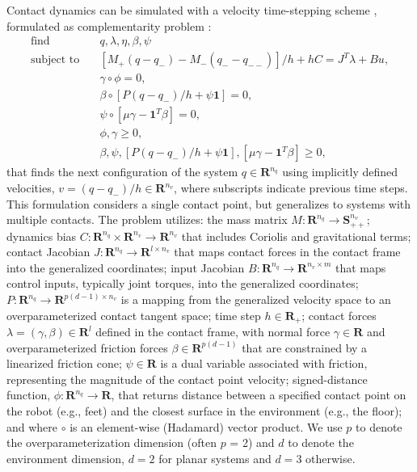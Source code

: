 Contact dynamics can be simulated with a velocity time-stepping scheme \cite{stewart1996implicit}, formulated as complementarity problem \cite{cottle2009linear}: 
\begin{align}
	\label{cipc_feas_prob}
	{\mbox{find}} \quad & q, \lambda,\eta, \beta, \psi \\
	\mbox{subject to} \quad & \left[M_{+}(q - q_{-}) - M_{-}(q_{-} - q_{--})\right] / h + h C = J^T \lambda + B u, \label{cipc_smooth_dynamics}\\
	& \gamma \circ \phi = 0, \label{cipc_impact_complementarity}\\
	& \beta \circ \left[ P (q - q_{-})/h + \psi \textbf{1} \right] = 0, \label{cipc_friction_complementarity} \\
	& \psi \circ \left[\mu \gamma - \textbf{1}^T \beta \right] = 0, \label{cipc_friction_velocity_complementarity}\\
	& \phi, \gamma \geq 0, \label{cipc_impact_inequalities} \\
	& \beta, \psi, [P (q - q_{-})/h + \psi \textbf{1}], [\mu \gamma - \textbf{1}^T \beta] \geq 0, \label{cipc_friction_inequalities}
\end{align}
that finds the next configuration of the system $q \in \mathbf{R}^{n_q}$ using implicitly defined velocities, $v = (q - q_{-}) / h \in \mathbf{R}^{n_v}$, where subscripts indicate previous time steps. This formulation considers a single contact point, but generalizes to systems with multiple contacts.
The problem utilizes: the mass matrix $M: \mathbf{R}^{n_q} \rightarrow \mathbf{S}_{++}^{n_v}$; dynamics bias $C: \mathbf{R}^{n_q} \times \mathbf{R}^{n_v} \rightarrow \mathbf{R}^{n_v}$ that includes Coriolis and gravitational terms; contact Jacobian $J: \mathbf{R}^{n_q} \rightarrow \mathbf{R}^{l \times n_v}$ that maps contact forces in the contact frame into the generalized coordinates; input Jacobian $B: \mathbf{R}^{n_q} \rightarrow \mathbf{R}^{n_v \times m}$ that maps control inputs, typically joint torques, into the generalized coordinates; $P: \mathbf{R}^{n_q} \rightarrow \mathbf{R}^{p (d-1) \times n_v}$ is a mapping from the generalized velocity space to an overparameterized contact tangent space; time step $h \in \mathbf{R}_{+}$; contact forces $\lambda = (\gamma, \beta) \in \mathbf{R}^l$ defined in the contact frame, with normal force $\gamma \in \mathbf{R}$ and overparameterized friction forces $\beta \in \mathbf{R}^{p (d - 1)}$ that are constrained by a linearized friction cone; $\psi \in \mathbf{R}$ is a dual variable associated with friction, representing the magnitude of the contact point velocity; signed-distance function, $\phi: \mathbf{R}^{n_q} \rightarrow \mathbf{R}$, that returns distance between a specified contact point on the robot (e.g., feet) and the closest surface in the environment (e.g., the floor); and where $\circ$ is an element-wise (Hadamard) vector product. We use $p$ to denote the overparameterization dimension (often $p$ = 2) and $d$ to denote the environment dimension, $d = 2$ for planar systems and $d = 3$ otherwise.

